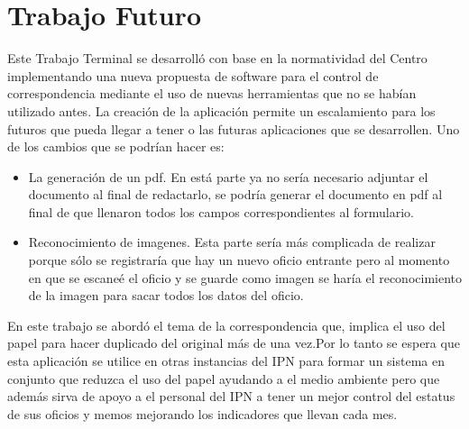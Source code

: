 \section{Trabajo Futuro}


Este Trabajo Terminal se desarrolló con base en la normatividad del Centro implementando una nueva propuesta de software  para el control de correspondencia mediante el uso de nuevas herramientas que no se habían utilizado antes. La creación de la aplicación permite un escalamiento para los futuros que pueda llegar a tener o las futuras aplicaciones que se desarrollen. Uno de los cambios que se podrían hacer es: \\

\begin{itemize}
	\item La generación de un pdf. En está parte ya no sería necesario adjuntar el documento al final de redactarlo, se podría generar el documento en pdf al final de que llenaron todos los campos correspondientes al formulario. 
	\item Reconocimiento de imagenes. Esta parte sería más complicada de realizar porque sólo se registraría que hay un nuevo oficio entrante pero al momento en que se escaneé el oficio y se guarde como imagen se haría el reconocimiento de la imagen para sacar todos los datos del oficio.
\end{itemize}

En este trabajo se abordó el tema de la correspondencia que, implica el uso del papel para hacer duplicado del original más de una vez.Por lo tanto se espera que esta aplicación se utilice en otras instancias del IPN para formar un sistema en conjunto que reduzca el uso del papel ayudando a el medio ambiente pero que además sirva de apoyo a el personal del IPN a tener un mejor control del estatus de sus oficios y memos mejorando los indicadores que llevan cada mes.\\
